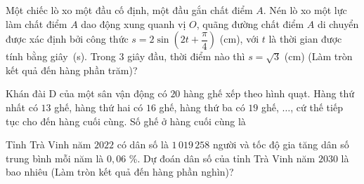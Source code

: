 \begin{ex}%
	Một chiếc lò xo một đầu cố định, một đầu gắn chất điểm $A$. Nén lò xo một lực làm chất điểm $A$ dao động xung quanh vị $O$, quãng đường chất điểm $A$ di chuyển được xác định bởi công thức $s=2\sin\left(2t+\dfrac{\pi}{4}\right)$ (cm), với $t$ là thời gian được tính bằng giây~(s). Trong $3$ giây đầu, thời điểm nào thì $s = \sqrt{3}$ (cm) (Làm tròn kết quả đến hàng phần trăm)?
\end{ex}
\begin{ex}%
	Khán đài D của một sân vận động có $20$ hàng ghế xếp theo hình quạt. Hàng thứ nhất có $13$ ghế, hàng thứ hai có $16$ ghế, hàng thứ ba có $19$ ghế, $\ldots$, cứ thế tiếp tục cho đến hàng cuối cùng. Số ghế ở hàng cuối cùng là
\end{ex}
\begin{ex}%
	Tỉnh Trà Vinh năm $2022$ có dân số là $1\,019\,258$ người và tốc độ gia tăng dân số trung bình mỗi năm là $0{,}06$ \%. Dự đoán dân số của tỉnh Trà Vinh năm $2030$ là bao nhiêu (Làm tròn kết quả đến hàng phần nghìn)?
\end{ex}
